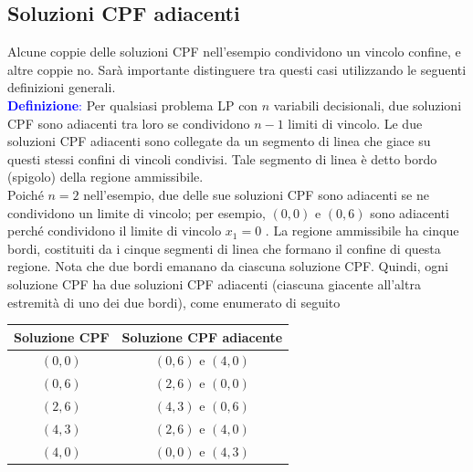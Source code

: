 \documentclass[12pt,a4paper]{article}
\begin{document}
\subsection{Soluzioni CPF adiacenti}
Alcune coppie delle soluzioni CPF nell'esempio condividono un vincolo confine, e altre coppie no. Sarà importante distinguere tra questi casi utilizzando le seguenti definizioni generali.\\
\textcolor{blue}{\textbf{Definizione}:} Per qualsiasi problema LP con $n$ variabili decisionali, due soluzioni CPF sono adiacenti tra loro se condividono $n-1$ limiti di vincolo. Le due soluzioni CPF adiacenti sono collegate da un segmento di linea che giace su questi stessi confini di vincoli condivisi. Tale segmento di linea è detto bordo (spigolo) della regione ammissibile.\\
Poiché $n = 2$ nell'esempio, due delle sue soluzioni CPF sono adiacenti se ne condividono un limite di vincolo; per esempio, $(0, 0)$ e $(0, 6)$ sono adiacenti perché condividono il limite di vincolo $x_1 = 0$ . La regione ammissibile ha cinque bordi, costituiti da i cinque segmenti di linea che formano il confine di questa regione. Nota che due bordi emanano da ciascuna soluzione CPF. Quindi, ogni soluzione CPF ha due soluzioni CPF adiacenti (ciascuna giacente all'altra estremità di uno dei due bordi), come enumerato di seguito
\begin{center}
\begin{tabular}{c|c}
Soluzione CPF & Soluzione CPF adiacente\\\hline
$(0,0)$ & $(0,6)$ e $(4,0)$\\
$(0,6)$ & $(2,6)$ e $(0,0)$\\
$(2,6)$ & $(4,3)$ e $(0,6)$\\
$(4,3)$ & $(2,6)$ e $(4,0)$\\
$(4,0)$ & $(0,0)$ e $(4,3)$\\
\end{tabular}
\end{center}
\end{document}
